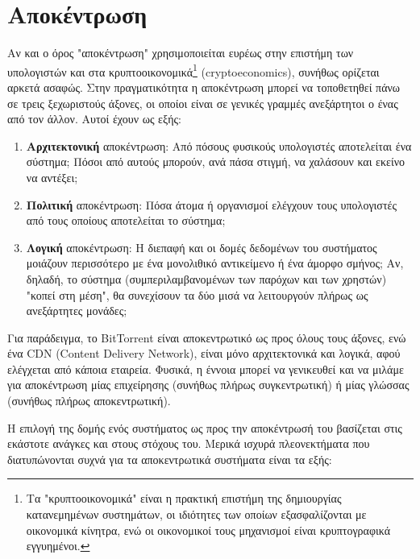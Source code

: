 \section{Αποκέντρωση}

Αν και ο όρος "αποκέντρωση" χρησιμοποιείται ευρέως στην επιστήμη των υπολογιστών και στα κρυπτοοικονομικά\footnote{Τα "κρυπτοοικονομικά" είναι η πρακτική επιστήμη της δημιουργίας κατανεμημένων συστημάτων, οι ιδιότητες των οποίων εξασφαλίζονται με οικονομικά κίνητρα, ενώ οι οικονομικοί τους μηχανισμοί είναι κρυπτογραφικά εγγυημένοι.\cite{1.2-ethereum-learn}} (cryptoeconomics), συνήθως ορίζεται αρκετά ασαφώς\cite{1.2-the-meaning-of-decentralization}. Στην πραγματικότητα η αποκέντρωση μπορεί να τοποθετηθεί πάνω σε τρεις ξεχωριστούς άξονες, οι οποίοι είναι σε γενικές γραμμές ανεξάρτητοι ο ένας από τον άλλον. Αυτοί έχουν ως εξής:

\begin{enumerate}
	\item \textbf{Αρχιτεκτονική} αποκέντρωση: Από πόσους φυσικούς υπολογιστές αποτελείται ένα σύστημα; Πόσοι από αυτούς μπορούν, ανά πάσα στιγμή, να χαλάσουν και εκείνο να αντέξει;
	\item \textbf{Πολιτική} αποκέντρωση: Πόσα άτομα ή οργανισμοί ελέγχουν τους υπολογιστές από τους οποίους αποτελείται το σύστημα;
	\item \textbf{Λογική} αποκέντρωση: Η διεπαφή και οι δομές δεδομένων του συστήματος μοιάζουν περισσότερο με ένα μονολιθικό αντικείμενο ή ένα άμορφο σμήνος; Αν, δηλαδή, το σύστημα (συμπεριλαμβανομένων των παρόχων και των χρηστών) "κοπεί στη μέση", θα συνεχίσουν τα δύο μισά να λειτουργούν πλήρως ως ανεξάρτητες μονάδες; 
\end{enumerate}

Για παράδειγμα, το BitTorrent είναι αποκεντρωτικό ως προς όλους τους άξονες, ενώ ένα CDN (Content Delivery Network), είναι μόνο αρχιτεκτονικά και λογικά, αφού ελέγχεται από κάποια εταιρεία. Φυσικά, η έννοια μπορεί να γενικευθεί και να μιλάμε για αποκέντρωση μίας επιχείρησης (συνήθως πλήρως συγκεντρωτική) ή μίας γλώσσας (συνήθως πλήρως αποκεντρωτική).

Η επιλογή της δομής ενός συστήματος ως προς την αποκέντρωσή του βασίζεται στις εκάστοτε ανάγκες και στους στόχους του. Μερικά ισχυρά πλεονεκτήματα που διατυπώνονται συχνά για τα αποκεντρωτικά συστήματα είναι τα εξής:

